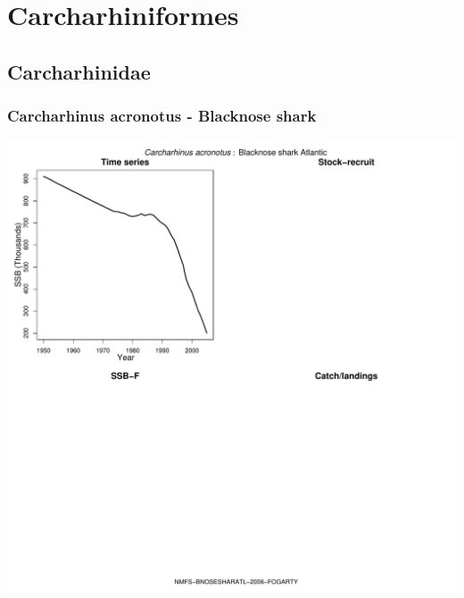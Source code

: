 \section{Carcharhiniformes}

\subsection{Carcharhinidae}

\subsubsection{Carcharhinus acronotus - Blacknose shark}
\begin{center}
\includegraphics[width=1.2\textwidth]{../R/figures/NMFS-BNOSESHARATL-2006-FOGARTY.pdf}
\end{center}

